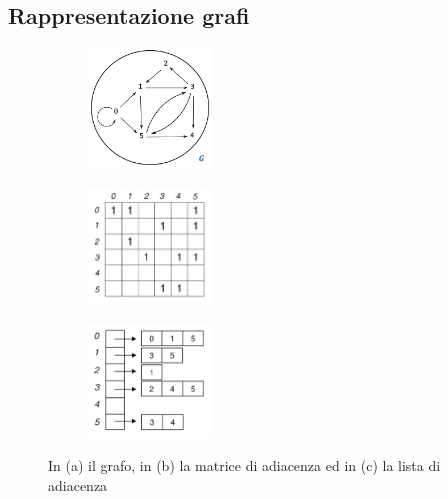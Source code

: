 \subsection{Rappresentazione grafi}
\begin{figure}[h!]
    \centering
    \begin{subfigure}{.3\textwidth}
        \centering
        \includegraphics[width=3.3cm]{images/esempio-grafo.png}
        \caption{}
    \end{subfigure}
    \hfill
    \begin{subfigure}{.3\textwidth}
        \centering
        \includegraphics[width=3.3cm]{images/matrice-adiacenza.png}
        \caption{}
    \end{subfigure}
    \hfill
    \begin{subfigure}{.3\textwidth}
        \centering
        \includegraphics[width=3.3cm]{images/liste-adiacenza.png}
        \caption{}
    \end{subfigure}
    \vspace{-5pt}
    \caption{In (a) il grafo, in (b) la matrice di adiacenza ed in (c) la lista di adiacenza}
\end{figure}
